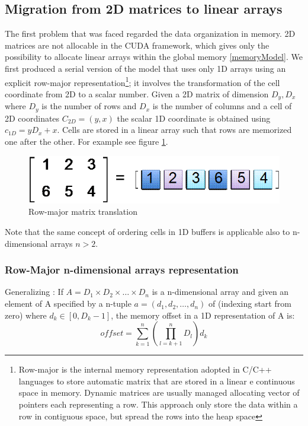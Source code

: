 \subsection{Migration from 2D matrices to linear arrays}
\label{1Dto2Dmemory}
The first problem that was faced regarded the data organization in memory.
2D matrices are not allocable in the CUDA framework, which gives only the
possibility to allocate linear arrays within the global memory
\ref{memoryModel}. We first produced a serial version of the model that uses
only 1D arrays using an explicit row-major representation\footnote{Row-major is the internal
memory representation adopted in C/C++ languages to store automatic matrix
that are stored in a linear e continuous space in memory. Dynamic matrices are
usually managed allocating vector of pointers each representing a row. This
approach only store the data within a row in contiguous space, but spread the
rows into the heap space}; it involves the transformation of the cell
coordinate from 2D to a scalar number.
Given a 2D matrix of dimension \(D_y,D_x\) where \(D_y\) is the number of
rows and \(D_x\) is the number of columns and a cell of 2D coordinates
\(C_{2D}=(y,x)\) the scalar 1D coordinate is obtained using \(c_{1D}=yD_x+x\).
Cells are stored in a linear array such that rows are memorized one after the
other.
For example see figure \ref{fig:rowMajor}. 
\begin{figure}
\begin{center}
\includegraphics[scale=0.45]{./images/rowmajor}
\caption{Row-major matrix translation}
\label{fig:rowMajor}
\end{center}
\end{figure}
\FloatBarrier
Note that the same concept of ordering cells in 1D buffers is applicable also to
n-dimensional arrays \(n > 2\).
\subsubsection{Row-Major n-dimensional arrays representation}
Generalizing : If \(A=D_1 \times D_2 \times  \ldots \times D_n\) is a
n-dimensional array and given an element of A specified by a n-tuple \(a=(d_1,d_2,\ldots,d_n)\)
of (indexing start from zero) where \(d_k \in [0, D_k-1]\), the
memory offset in a 1D representation of A is:
\[
offset=\sum_{k=1}^{n}\left ( {  \prod_{l=k+1}^{n}D_l}\right )  d_k
\]


